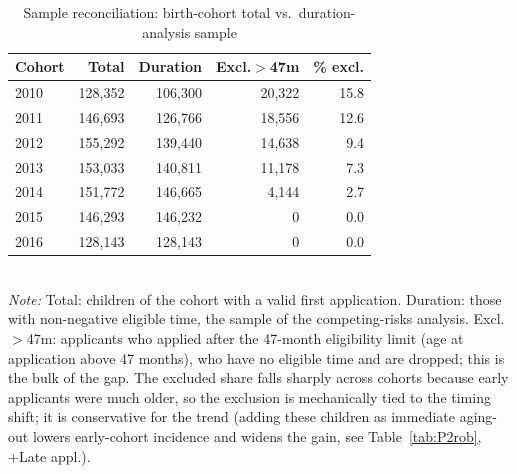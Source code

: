 \begin{table}[htbp]\centering
\caption{Sample reconciliation: birth-cohort total vs.\ duration-analysis sample}
\label{tab:P2rec}
\footnotesize
\setlength{\tabcolsep}{4pt}
\begin{tabular}{lrrrr}
\toprule
Cohort & Total & Duration & Excl.$>$47m & \% excl. \\
\midrule
2010 & 128,352 & 106,300 & 20,322 & 15.8 \\
2011 & 146,693 & 126,766 & 18,556 & 12.6 \\
2012 & 155,292 & 139,440 & 14,638 & 9.4 \\
2013 & 153,033 & 140,811 & 11,178 & 7.3 \\
2014 & 151,772 & 146,665 & 4,144 & 2.7 \\
2015 & 146,293 & 146,232 & 0 & 0.0 \\
2016 & 128,143 & 128,143 & 0 & 0.0 \\
\bottomrule
\end{tabular}
\\[3pt]{\footnotesize \textit{Note:} Total: children of the cohort with a valid first application. Duration: those with non-negative eligible time, the sample of the competing-risks analysis. Excl.$>$47m: applicants who applied after the 47-month eligibility limit (age at application above 47 months), who have no eligible time and are dropped; this is the bulk of the gap. The excluded share falls sharply across cohorts because early applicants were much older, so the exclusion is mechanically tied to the timing shift; it is conservative for the trend (adding these children as immediate aging-out lowers early-cohort incidence and widens the gain, see Table~\ref{tab:P2rob}, +Late appl.).}
\end{table}
